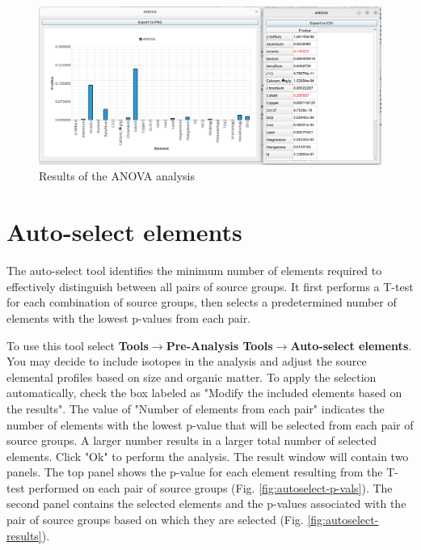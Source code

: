 \documentclass[12pt]{report}
\begin{document}
\begin{figure}[ht]
    \centering
    \includegraphics[width=14cm]{Figures/ANOVA_results.png} 
    \caption{Results of the ANOVA analysis}
    \label{fig:Anova_Results}
\end{figure}
\FloatBarrier

\section{Auto-select elements}
The auto-select tool identifies the minimum number of elements required to effectively distinguish between all pairs of source groups. It first performs a T-test for each combination of source groups, then selects a predetermined number of elements with the lowest p-values from each pair.

To use this tool select \textbf{Tools}$\rightarrow$\textbf{Pre-Analysis Tools}$\rightarrow$\textbf{Auto-select elements}. You may decide to include isotopes in the analysis and adjust the source elemental profiles based on size and organic matter. To apply the selection automatically, check the box labeled as "Modify the included elements based on the results". The value of "Number of elements from each pair" indicates the number of elements with the lowest p-value that will be selected from each pair of source groups. A larger number results in a larger total number of selected elements. Click "Ok" to perform the analysis. The result window will contain two panels. The top panel shows the p-value for each element resulting from the T-test performed on each pair of source groups (Fig. \ref{fig:autoselect-p-vals}). The second panel contains the selected elements and the p-values associated with the pair of source groups based on which they are selected (Fig. \ref{fig:autoselect-results}).  
\end{document}
